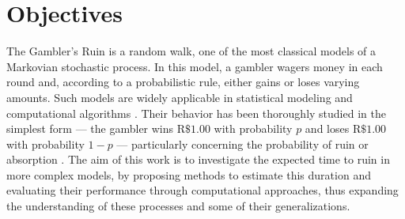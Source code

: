 \documentclass[a4paper,10pt,twocolumn]{article}
\begin{document}
\pagestyle{fancy}
\fancyhead{}
\renewcommand{\headrulewidth}{0pt}


\section{Objectives}

The Gambler’s Ruin is a random walk, one of the most classical models of a
Markovian stochastic process. In this model, a gambler wagers money in each
round and, according to a probabilistic rule, either gains or loses varying
amounts. Such models are widely applicable in statistical modeling and
computational algorithms \cite{ross_markov_2019}. Their behavior has been
thoroughly studied in the simplest form — the gambler wins
$\mathrm{R}\$1.00$ with probability $p$ and loses $\mathrm{R}\$1.00$ with
probability $1-p$ — particularly concerning the probability of ruin or
absorption \cite{ross_introduction_2019}. The aim of this work is to investigate
the expected time to ruin in more complex models, by proposing methods to
estimate this duration and evaluating their performance through computational
approaches, thus expanding the understanding of these processes and some of
their generalizations.
\end{document}
